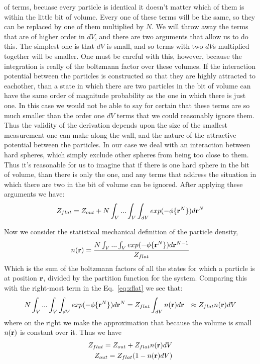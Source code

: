 of terms, becuase every particle is identical it doesn't matter which
of them is within the little bit of volume.  Every one of these terms
will be the same, so they can be replaced by one of them multiplied by
$N$.  We will throw away the terms that are of higher order in $dV$,
and there are two arguments that allow us to do this.  The simplest
one is that $dV$ is small, and so terms with two $dV$s multiplied
together will be smaller.  One must be careful with this, however,
because the integration is really of the boltzmann factor over these
volumes.  If the interaction potential between the particles is
constructed so that they are highly attracted to eachother, than a
state in which there are two particles in the bit of volume can have
the same order of magnitude probability as the one in which there is
just one.  In this case we would not be able to say for certain that
these terms are so much smaller than the order one $dV$ terms that we
could reasonably ignore them. Thus the validity of the derivation
depends upon the size of the smallest measurement one can make along
the wall, and the nature of the attractive potential between the
particles.  In our case we deal with an interaction between hard
spheres, which simply exclude other spheres from being too close to
them.  Thus it's reasonable for us to imagine that if there is one
hard sphere in the bit of volume, than there is only the one, and any
terms that address the situation in which there are two in the bit of
volume can be ignored.  After applying these arguments we have:
\begin{align}
  \label{eq:zflat}
  Z_{flat} = Z_{out} + N \int_V... \int_V \int_{dV} exp(-\phi \{ \textbf{r}^N \})d\textbf{r}^N
\end{align}

Now we consider the statistical mechanical definition of the particle
density,
\begin{align}
  n(\textbf{r}) = \frac{N \int_V... \int_V exp(-\phi \{ \textbf{r}^N \})d\textbf{r}^{N-1}}{Z_{flat}}
\end{align}
Which is the sum of the boltzmann factors of all the states for which
a particle is at position $\textbf{r}$, divided by the partition function for
the system.  Comparing this with the right-most term in the
Eq.~\ref{eq:zflat} we see that:
\begin{align}
 N \int_V... \int_V \int_{dV} exp(-\phi \{ \textbf{r}^N \})d\textbf{r}^N  &= Z_{flat} \int_{dV} n(\textbf{r}) d\textbf{r}
 &\approx Z_{flat} n(\textbf{r})dV
\end{align}
where on the right we make the approximation that because the volume
is small $n(\textbf{r})$ is constant over it.
Thus we have
\begin{align}
Z_{flat} = Z_{out} + Z_{flat} n(\textbf{r})dV \\
Z_{out} = Z_{flat} (1-n(\textbf{r})dV)
\end{align}

